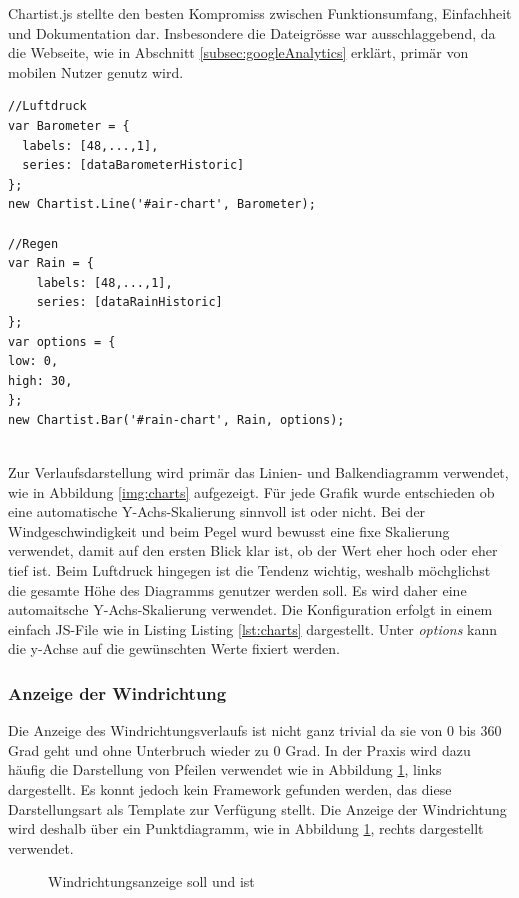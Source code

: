 \noindent
Chartist.js stellte den besten Kompromiss zwischen Funktionsumfang, Einfachheit und Dokumentation dar. Insbesondere die Dateigrösse war ausschlaggebend, da die Webseite, wie in Abschnitt \ref{subsec:googleAnalytics} erklärt, primär von mobilen Nutzer genutz wird.

\begin{lstlisting}[label=lst:charts,caption=Konfiguration der Verlaufsdiagramme, language=HTML5, style=htmlcssjs]
//Luftdruck
var Barometer = {
  labels: [48,...,1],
  series: [dataBarometerHistoric]
};
new Chartist.Line('#air-chart', Barometer);

//Regen
var Rain = {
	labels: [48,...,1],
	series: [dataRainHistoric]
};
var options = {
low: 0,
high: 30,
};
new Chartist.Bar('#rain-chart', Rain, options);
\end{lstlisting}
\ \\


Zur Verlaufsdarstellung wird primär das Linien- und Balkendiagramm verwendet, wie in Abbildung \ref{img:charts} aufgezeigt. Für jede Grafik wurde entschieden ob eine automatische Y-Achs-Skalierung sinnvoll ist oder nicht. Bei der Windgeschwindigkeit und beim Pegel wurd bewusst eine fixe Skalierung verwendet, damit auf den ersten Blick klar ist, ob der Wert eher hoch oder eher tief ist. Beim Luftdruck hingegen ist die Tendenz wichtig, weshalb möchglichst die gesamte Höhe des Diagramms genutzer werden soll. Es wird daher eine automaitsche Y-Achs-Skalierung verwendet. Die Konfiguration erfolgt in einem einfach JS-File wie in Listing Listing \ref{lst:charts}  dargestellt. Unter \textit{options} kann die y-Achse auf die gewünschten Werte fixiert werden.\newline


\subsubsection{Anzeige der Windrichtung}
Die Anzeige des Windrichtungsverlaufs ist nicht ganz trivial da sie von 0 bis 360 Grad geht und ohne Unterbruch wieder zu 0 Grad. In der Praxis wird dazu häufig die Darstellung von Pfeilen verwendet wie in Abbildung \ref{img:windrichtung}, links dargestellt. Es konnt jedoch kein Framework gefunden werden, das diese Darstellungsart als Template zur Verfügung stellt. Die Anzeige der Windrichtung wird deshalb über ein Punktdiagramm, wie in Abbildung \ref{img:windrichtung}, rechts dargestellt verwendet.

\begin{figure}[h!]
	\centering
	\caption{Windrichtungsanzeige soll und ist}
	\label{img:windrichtung}
\end{figure}

